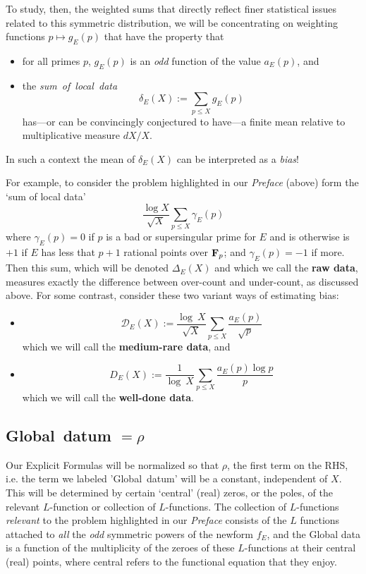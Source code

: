 \documentclass[11pt]{article}
\theoremstyle{plain}
\theoremstyle{definition}
\numberwithin{equation}{section}
\numberwithin{figure}{section}
\numberwithin{table}{section}
\begin{document}
\vskip20pt
  To study, then, the weighted sums that directly reflect finer statistical issues related to this symmetric distribution, we will be concentrating on weighting functions $p \mapsto g_E(p)$ that have the property that \begin{itemize} \item for all primes $p$, $g_E(p)$ is an {\it odd} function of the value  $a_E(p)$, and \item the {\it sum\ of\ local\ data}  $$\delta_E(X):=\sum_{p\le X}g_E(p)$$ has---or can be convincingly conjectured to have---a finite mean  %
    relative to multiplicative measure $dX/X$.\end{itemize}  In such a context  the mean of $\delta_E(X)$ can be interpreted as a {\it bias}!


 For example, to consider  the problem highlighted in our {\it Preface} (above) form  the `sum of local data'
  $${\frac{\log X}{{\sqrt X}}}\sum_{p\le X}\gamma_E(p)$$  where $\gamma_E(p)=0$ if $p$ is a bad or supersingular prime for $E$ and is otherwise is $+1$ if $E$ has less that $p+1$ rational points over ${\bf F}_p$; and $\gamma_E(p) = -1$ if more.  Then this sum, which will be denoted $\Delta_E(X)$ and which we call the {\bf raw data}, measures exactly the difference between over-count and under-count, as discussed above.  For some contrast, consider these two variant ways of estimating bias:
  \begin{itemize}
 \item   $${\mathcal D}_E(X):= {\frac{\log\ X}{\sqrt X}}\sum_{p \le X}{\frac{a_E(p)}{\sqrt p}}$$  which we will call  the {\bf medium-rare data}, and \item
  $${D}_E(X):= {\frac{1}{\log\ X}}\sum_{p \le X}{\frac{a_E(p)\log p}{ p}}$$  which we will call the {\bf well-done data}.
  \end{itemize}\vskip10pt


\subsection{ Global\ datum $ =\rho$ }

Our Explicit Formulas will be normalized so that $\rho$, the first  term on the RHS, i.e. the term we labeled 'Global\ datum' will be a constant, independent of $X$. This will be   determined by  certain `central'  (real)  zeros, or the poles, of the relevant $L$-function or collection of $L$-functions. The   collection of $L$-functions {\it relevant} to the problem highlighted in our {\it Preface} consists of  the $L$ functions attached to {\it all}  the {\it odd} symmetric powers of the newform $f_E$, and the Global data is a function of the multiplicity of the zeroes of these $L$-functions at their central (real) points, where central refers to the functional equation that they enjoy.
\end{document}
